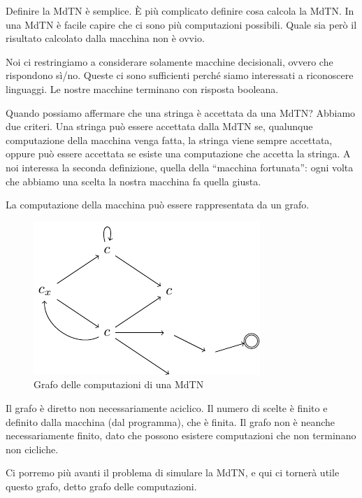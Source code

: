 Definire la MdTN è semplice. È più complicato definire cosa calcola la MdTN. In una MdTN è
facile capire che ci sono più computazioni possibili. Quale sia però il risultato calcolato dalla
macchina non è ovvio.

Noi ci restringiamo a considerare solamente macchine decisionali, ovvero che rispondono sì/no.
Queste ci sono sufficienti perché siamo interessati a riconoscere linguaggi. Le nostre macchine
terminano con risposta booleana.

Quando possiamo affermare che una stringa è accettata da una MdTN? Abbiamo due criteri. Una stringa
può essere accettata dalla MdTN se, qualunque computazione della macchina venga fatta, la stringa
viene sempre accettata, oppure può essere accettata se esiste una computazione che accetta la
stringa. A noi interessa la seconda definizione, quella della ``macchina fortunata'': ogni volta che
abbiamo una scelta la nostra macchina fa quella giusta.


La computazione della macchina può essere rappresentata da un grafo.

\begin{figure}[h]
    \begin{center}
        \includegraphics{./img/nondeterminism/MdTN.pdf}
        \caption{Grafo delle computazioni di una MdTN}
    \end{center}
\end{figure}

Il grafo è diretto non necessariamente aciclico. Il numero di scelte è finito e definito dalla
macchina (dal programma), che è finita. Il grafo non è neanche necessariamente finito, dato che
possono esistere computazioni che non terminano non cicliche.

Ci porremo più avanti il problema di simulare la MdTN, e qui ci tornerà utile questo grafo, detto
grafo delle computazioni.

